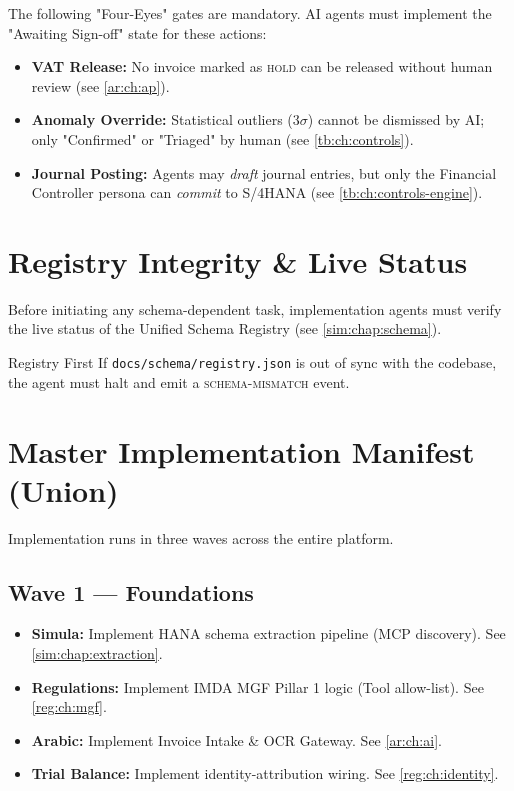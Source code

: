 \documentclass[11pt,a4paper,twoside]{report}
\begin{document}
The following "Four-Eyes" gates are mandatory. AI agents must implement the "Awaiting Sign-off" state for these actions:
\begin{itemize}
\item \textbf{VAT Release:} No invoice marked as \textsc{hold} can be released without human review (see \cref{ar:ch:ap}).
\item \textbf{Anomaly Override:} Statistical outliers ($3\sigma$) cannot be dismissed by AI; only "Confirmed" or "Triaged" by human (see \cref{tb:ch:controls}).
\item \textbf{Journal Posting:} Agents may \emph{draft} journal entries, but only the Financial Controller persona can \emph{commit} to S/4HANA (see \cref{tb:ch:controls-engine}).
\end{itemize}

\section{Registry Integrity \& Live Status}
\label{sec:registry-integrity}

Before initiating any schema-dependent task, implementation agents must verify the live status of the Unified Schema Registry (see \cref{sim:chap:schema}).
\begin{adrbox}{Registry First}
If \texttt{docs/schema/registry.json} is out of sync with the codebase, the agent must halt and emit a \textsc{schema-mismatch} event.
\end{adrbox}

\section{Master Implementation Manifest (Union)}
Implementation runs in three waves across the entire platform.

\subsection*{Wave 1 --- Foundations}
\begin{itemize}
\item \textbf{Simula:} Implement HANA schema extraction pipeline (MCP discovery). See \cref{sim:chap:extraction}.
\item \textbf{Regulations:} Implement IMDA MGF Pillar 1 logic (Tool allow-list). See \cref{reg:ch:mgf}.
\item \textbf{Arabic:} Implement Invoice Intake \& OCR Gateway. See \cref{ar:ch:ai}.
\item \textbf{Trial Balance:} Implement identity-attribution wiring. See \cref{reg:ch:identity}.
\end{itemize}
\end{document}
